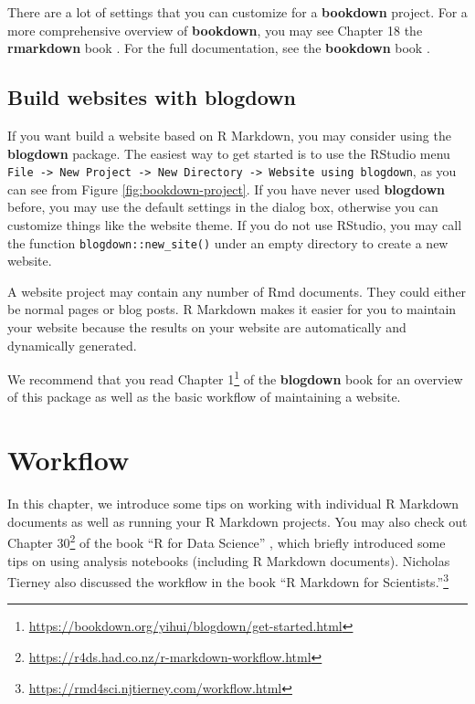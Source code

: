 \documentclass[
  11pt,
]{krantz}
\renewcommand{\href}[2]{#2\footnote{\url{#1}}}
\begin{document}
There are a lot of settings that you can customize for a \textbf{bookdown} project. For a more comprehensive overview of \textbf{bookdown}, you may see Chapter 18 the \textbf{rmarkdown} book \citep{rmarkdown2018}. For the full documentation, see the \textbf{bookdown} book \citep{bookdown2016}.

\hypertarget{blogdown}{%
\section{\texorpdfstring{Build websites with \textbf{blogdown}}{Build websites with blogdown}}\label{blogdown}}

If you want build a website based on R Markdown, you may consider using the \textbf{blogdown} package. The easiest way to get started is to use the RStudio menu \texttt{File\ -\textgreater{}\ New\ Project\ -\textgreater{}\ New\ Directory\ -\textgreater{}\ Website\ using\ blogdown}, as you can see from Figure \ref{fig:bookdown-project}. If you have never used \textbf{blogdown} before, you may use the default settings in the dialog box, otherwise you can customize things like the website theme. If you do not use RStudio, you may call the function \texttt{blogdown::new\_site()} under an empty directory to create a new website.

A website project may contain any number of Rmd documents. They could either be normal pages or blog posts. R Markdown makes it easier for you to maintain your website because the results on your website are automatically and dynamically generated.

We recommend that you read \href{https://bookdown.org/yihui/blogdown/get-started.html}{Chapter 1} of the \textbf{blogdown} book \citep{blogdown2017} for an overview of this package as well as the basic workflow of maintaining a website.

\hypertarget{workflow}{%
\chapter{Workflow}\label{workflow}}

In this chapter, we introduce some tips on working with individual R Markdown documents as well as running your R Markdown projects. You may also check out \href{https://r4ds.had.co.nz/r-markdown-workflow.html}{Chapter 30} of the book ``R for Data Science'' \citep{wickham2016}, which briefly introduced some tips on using analysis notebooks (including R Markdown documents). Nicholas Tierney also discussed the workflow in the book \href{https://rmd4sci.njtierney.com/workflow.html}{``R Markdown for Scientists.''}
\end{document}
